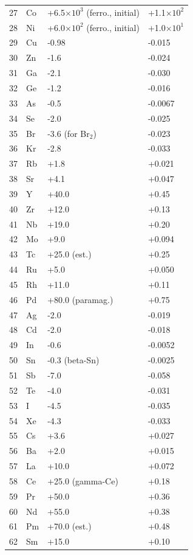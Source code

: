 \documentclass[12pt,a4paper]{article}
\begin{document}
\begin{longtable}{p{0.6cm}p{1.2cm}p{2.5cm}p{2.5cm}}
		27 & Co & +6.5\(\times10^3\) (ferro., initial) & +1.1\(\times10^2\) \\
		28 & Ni & +6.0\(\times10^2\) (ferro., initial) & +1.0\(\times10^1\) \\
		29 & Cu & -0.98 & -0.015 \\
		30 & Zn & -1.6 & -0.024 \\
		31 & Ga & -2.1 & -0.030 \\
		32 & Ge & -1.2 & -0.016 \\
		33 & As & -0.5 & -0.0067 \\
		34 & Se & -2.0 & -0.025 \\
		35 & Br & -3.6 (for Br\(_2\)) & -0.023 \\
		36 & Kr & -2.8 & -0.033 \\
		37 & Rb & +1.8 & +0.021 \\
		38 & Sr & +4.1 & +0.047 \\
		39 & Y  & +40.0 & +0.45 \\
		40 & Zr & +12.0 & +0.13 \\
		41 & Nb & +19.0 & +0.20 \\
		42 & Mo & +9.0 & +0.094 \\
		43 & Tc & +25.0 (est.) & +0.25 \\
		44 & Ru & +5.0 & +0.050 \\
		45 & Rh & +11.0 & +0.11 \\
		46 & Pd & +80.0 (paramag.) & +0.75 \\
		47 & Ag & -2.0 & -0.019 \\
		48 & Cd & -2.0 & -0.018 \\
		49 & In & -0.6 & -0.0052 \\
		50 & Sn & -0.3 (beta-Sn) & -0.0025 \\
		51 & Sb & -7.0 & -0.058 \\
		52 & Te & -4.0 & -0.031 \\
		53 & I  & -4.5 & -0.035 \\
		54 & Xe & -4.3 & -0.033 \\
		55 & Cs & +3.6 & +0.027 \\
		56 & Ba & +2.0 & +0.015 \\
		57 & La & +10.0 & +0.072 \\
		58 & Ce & +25.0 (gamma-Ce) & +0.18 \\
		59 & Pr & +50.0 & +0.36 \\
		60 & Nd & +55.0 & +0.38 \\
		61 & Pm & +70.0 (est.) & +0.48 \\
		62 & Sm & +15.0 & +0.10 \\

\end{longtable}
\end{document}
